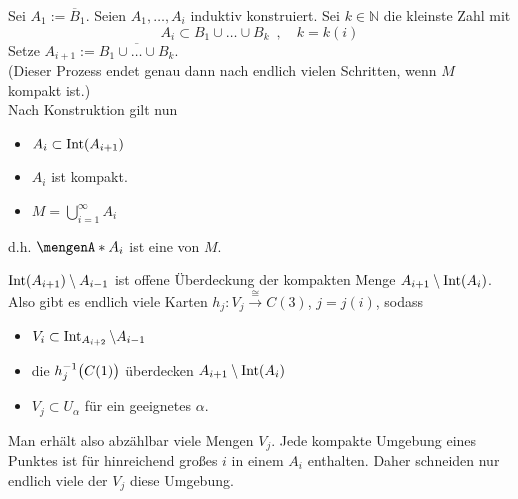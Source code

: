 Sei $A_1 := \overline{B}_1 $. Seien $A_1, \ldots , A_i$ induktiv konstruiert. Sei $k \in \mathds{N}$ die kleinste Zahl mit 
\[
	A_i \subset B_1 \cup \ldots \cup B_k \enspace , \quad k=k(i)
\]
Setze $A_{i+1} := \overline{B_1 \cup \ldots  \cup B_k}$. \\
(Dieser Prozess endet genau dann nach endlich vielen Schritten, wenn $M$ kompakt ist.) \smallskip \\
Nach Konstruktion gilt nun
\begin{itemize}
	\item $A_i \subset \Int(A_{i+1})$
	\item $A_i$ ist kompakt.
	\item $M = \bigcup_{i=1}^\infty A_i$
\end{itemize}
d.h. $\set{A_i}$ ist eine  von $M$. 
\begin{figure}[H]
\end{figure}
$\Int(A_{i+1}) \setminus A_{i-1}$ ist offene Überdeckung der kompakten Menge $A_{i+1} \setminus \Int(A_{i})$. Also gibt es endlich viele Karten $h_j : V_j \xrightarrow{\cong} C(3) $, $j= j(i)$, sodass 
\begin{itemize}
	\item $V_i \subset \Int_{A_{i+2}} \setminus A_{i-1}$
	\item die $h_j ^{-1}\enbrace[\big]{C(1)}$ überdecken $A_{i+1} \setminus \Int(A_i)$
	\item $V_j \subset U_\alpha$ für ein geeignetes $\alpha$.
\end{itemize}
Man erhält also abzählbar viele Mengen $V_j$. Jede kompakte Umgebung eines Punktes ist für hinreichend großes $i$ in einem $A_i$ enthalten. Daher schneiden nur endlich 
viele der $V_j$ diese Umgebung. \bewende

